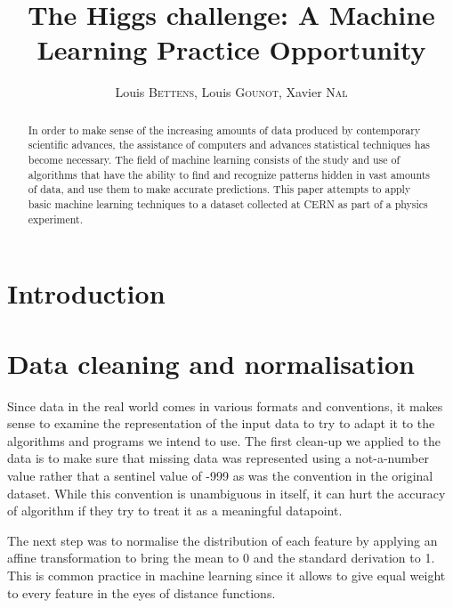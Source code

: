 \documentclass[10pt,conference,compsocconf]{IEEEtran}
\begin{document}
\title{The Higgs challenge: A Machine Learning Practice Opportunity}

\author{
	Louis \textsc{Bettens}, Louis \textsc{Gounot}, Xavier \textsc{Nal}
}

\maketitle

\begin{abstract}
	In order to make sense of the increasing amounts of data produced by contemporary scientific advances, the assistance of computers and advances statistical techniques has become necessary.
	The field of machine learning consists of the study and use of algorithms that have the ability to find and recognize patterns hidden in vast amounts of data, and use them to make accurate predictions.
	This paper attempts to apply basic machine learning techniques to a dataset collected at CERN as part of a physics experiment.
\end{abstract}

\section{Introduction}

\section{Data cleaning and normalisation}
\label{sec:data-cleaning}

Since data in the real world comes in various formats and conventions, it makes sense to examine the representation of the input data to try to adapt it to the algorithms and programs we intend to use.
The first clean-up we applied to the data is to make sure that missing data was represented using a not-a-number value rather that a sentinel value of -999 as was the convention in the original dataset.
While this convention is unambiguous in itself, it can hurt the accuracy of algorithm if they try to treat it as a meaningful datapoint.

The next step was to normalise the distribution of each feature by applying an affine transformation to bring the mean to 0 and the standard derivation to 1. This is common practice in machine learning since it allows to give equal weight to every feature in the eyes of distance functions.

\end{document}
